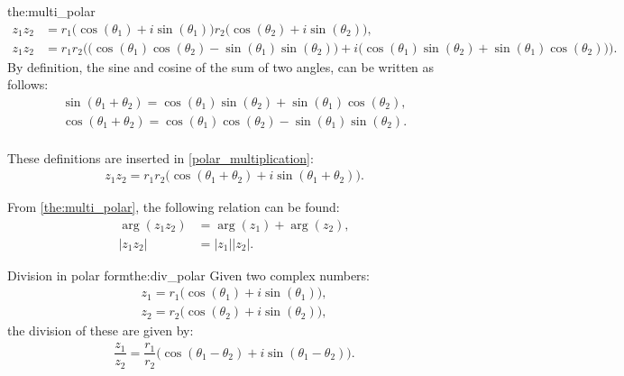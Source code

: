 \begin{prof}{}{the:multi_polar}
\begin{align}
z_1 z_2&=r_1 \big( \cos(\theta_1)+ i \sin(\theta_1)\big)r_2 \big( \cos(\theta_2)+ i \sin(\theta_2)\big), \nonumber
\\
\label{polar_multiplication}
z_1z_2&=r_1r_2\Big( \big(\cos(\theta_1)\cos(\theta_2)-\sin(\theta_1) \sin(\theta_2)\big)+i\big(\cos(\theta_1)\sin(\theta_2)+\sin(\theta_1)\cos(\theta_2)\big)\Big).
\end{align}
By definition, the sine and cosine of the sum of two angles, can be written as follows: \cite[p. A-14, Appendices]{calc}
\\
\begin{align} 
\sin(\theta_1+\theta_2)=\cos(\theta_1)\sin(\theta_2)+\sin(\theta_1)\cos(\theta_2), \label{sum_cos_sin}
\end{align}
\begin{align*}
\cos(\theta_1+\theta_2)=\cos(\theta_1)\cos(\theta_2)-\sin(\theta_1)\sin(\theta_2).
\end{align*}
\\
These definitions are inserted in \eqref{polar_multiplication}:
\\
\begin{align*}
z_1 z_2=r_1r_2\big( \cos(\theta_1+\theta_2)+ i \sin(\theta_1+\theta_2)\big).
\end{align*}
\end{prof}
\noindent
From  \eqref{the:multi_polar}, the following relation can be found:
\begin{align*}
\arg(z_1z_2)&=\arg(z_1)+\arg(z_2),
\\
|z_1z_2|&=|z_1||z_2|.
\end{align*}

\begin{theorem}{Division in polar form}{the:div_polar}
Given two complex numbers:
\begin{align*}
z_1=r_1\big(\cos(\theta_1)+i\sin(\theta_1)\big), 
\\
z_2=r_2\big(\cos(\theta_2)+i\sin(\theta_2)\big),
\end{align*}
the division of these are given by:
\begin{align*}
\dfrac{z_1}{z_2}=\dfrac{r_1}{r_2}\Big( \cos(\theta_1-\theta_2)+ i \sin(\theta_1-\theta_2)\Big).
\end{align*}
\end{theorem}


